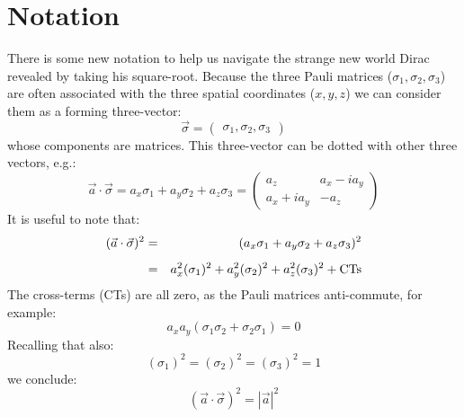 \documentclass[12pt]{book}
\begin{document}
\section{Notation}

There is some new notation to help us navigate the strange new world Dirac revealed by taking his square-root.  Because the three Pauli matrices ($\sigma_1, \sigma_2, \sigma_3$) are often associated with the three spatial coordinates ($x, y, z$) we can consider them as a forming three-vector:
$$\vec{\sigma} = \begin{pmatrix} \sigma_1, \sigma_2, \sigma_3 \end{pmatrix}$$
whose components are matrices.  This three-vector can be dotted with other three vectors, e.g.:
$$\vec{a} \cdot \vec{\sigma} = a_x \sigma_1 + a_y \sigma_2 + a_z \sigma_3
= \begin{pmatrix} a_z & a_x - i a_y \\ a_x + i a_y & -a_z \end{pmatrix}
$$
It is useful to note that:
\begin{eqnarray*}
(\vec{a} \cdot \vec{\sigma})^2 &=& (a_x \sigma_1 + a_y \sigma_2 + a_z \sigma_3)^2\\[5pt]
&=& a_x^2 (\sigma_1)^2 + a_y^2 (\sigma_2)^2 + a_z^2 (\sigma_3)^2 + {\rm CTs}\\
\end{eqnarray*}
The cross-terms (CTs) are all zero, as the Pauli matrices anti-commute, for example:
$$a_x a_y (\sigma_1 \sigma_2 + \sigma_2 \sigma_1) = 0$$
Recalling that also:
$$(\sigma_1)^2 = (\sigma_2)^2 = (\sigma_3)^2 = 1$$
we conclude:
$$(\vec{a}\cdot\vec{\sigma})^2 = |\vec{a}|^2$$
\end{document}

